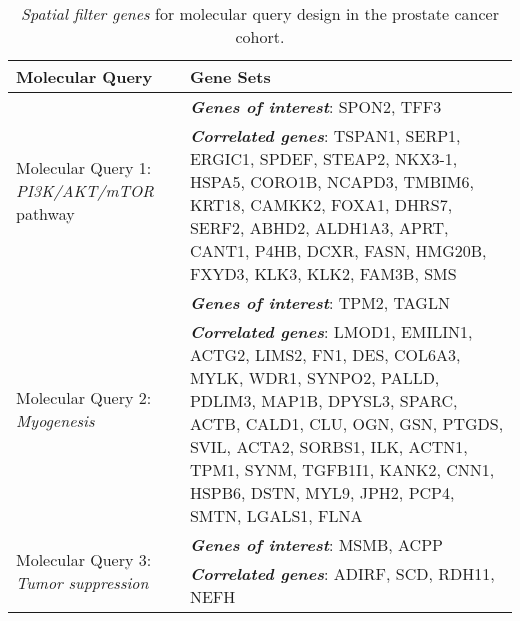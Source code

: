 \begin{table}[h!]
    \centering
    \caption{\textit{Spatial filter genes} for molecular query design in the prostate cancer cohort.}
    \begin{tabular}{|p{4cm}|p{12cm}|} 
        \hline
        \textbf{Molecular Query} & \textbf{Gene Sets} \\
        \hline
        \multirow{2}{4cm}{Molecular Query 1: \textit{PI3K/AKT/mTOR} pathway} 
        & \textbf{\textit{Genes of interest}}: SPON2, TFF3 \\  
        & \textit{\textbf{Correlated genes}}: TSPAN1, SERP1, ERGIC1, SPDEF, STEAP2, NKX3-1, HSPA5, CORO1B, NCAPD3, TMBIM6, KRT18, CAMKK2, FOXA1, DHRS7, SERF2, ABHD2, ALDH1A3, APRT, CANT1, P4HB, DCXR, FASN, HMG20B, FXYD3, KLK3, KLK2, FAM3B, SMS \\  
        \hline
        \multirow{2}{4cm}{Molecular Query 2: \textit{Myogenesis}}  
        & \textbf{\textit{Genes of interest}}: TPM2, TAGLN \\  
        & \textit{\textbf{Correlated genes}}: LMOD1, EMILIN1, ACTG2, LIMS2, FN1, DES, COL6A3, MYLK, WDR1, SYNPO2, PALLD, PDLIM3, MAP1B, DPYSL3, SPARC, ACTB, CALD1, CLU, OGN, GSN, PTGDS, SVIL, ACTA2, SORBS1, ILK, ACTN1, TPM1, SYNM, TGFB1I1, KANK2, CNN1, HSPB6, DSTN, MYL9, JPH2, PCP4, SMTN, LGALS1, FLNA \\  
        \hline
        \multirow{2}{4cm}{Molecular Query 3: \textit{Tumor suppression}}  
        & \textbf{\textit{Genes of interest}}: MSMB, ACPP \\  
        & \textit{\textbf{Correlated genes}}: ADIRF, SCD, RDH11, NEFH \\  
        \hline
    \end{tabular}
    \label{tab:query_genes}
\end{table}

